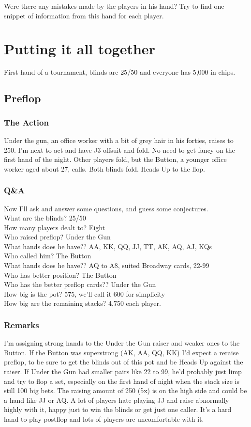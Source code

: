 Were there any mistakes made by the players in his hand? Try to find
one snippet of information from this hand for each player.

\section{Putting it all together}

First hand of a tournament, blinds are 25/50 and everyone has 5,000 in chips.

\subsection*{Preflop}

\subsubsection*{The Action}
Under the gun, an office worker with a bit of grey hair in his forties,
raises to 250. I'm next to act and have J3 offsuit and fold.
No need to get fancy on the first hand of the night. Other players fold,
but the Button, a younger office worker aged about 27, calls. Both blinds fold. 
Heads Up to the flop.

\subsubsection*{Q\&A}
Now I'll ask and answer some questions, and guess some conjectures. \\
What are the blinds? 25/50 \\
How many players dealt to? Eight \\
Who raised preflop? Under the Gun \\
What hands does he have?? AA, KK, QQ, JJ, TT, AK, AQ, AJ, KQs \\
Who called him? The Button \\
What hands does he have?? AQ to A8, suited Broadway cards, 22-99 \\
Who has better position? The Button \\
Who has the better preflop cards?? Under the Gun \\
How big is the pot? 575, we'll call it 600 for simplicity \\
How big are the remaining stacks? 4,750 each player.

\subsubsection*{Remarks}
I'm assigning strong hands to the Under the Gun raiser and 
weaker ones to the Button.
If the Button was superstrong (AK, AA, QQ, KK) I'd expect a reraise
preflop, to be sure to get the blinds out of this pot and be Heads Up
against the raiser. If Under the Gun had smaller pairs like 22 to 99,
he'd probably just limp and try to flop a set, especially on
the first hand of night when the stack size is still 100 big bets.
The raising amount of 250 (5x) is on the high side and could be
a hand like JJ or AQ. A lot of players hate playing JJ and raise
abnormally highly with it, happy just to win the blinds or get
just one caller. It's a hard hand to play postflop and lots
of players are uncomfortable with it.

